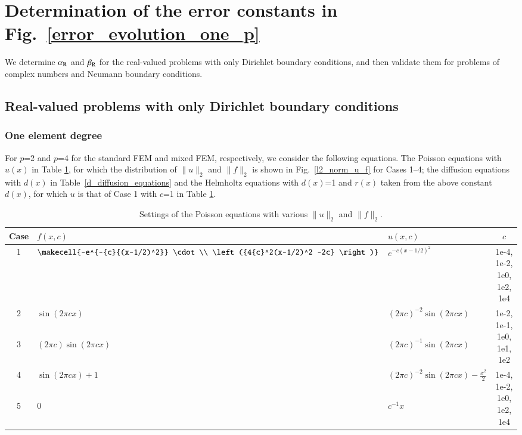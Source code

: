 \documentclass[review,3p]{elsarticle}
\begin{document}
\section{Determination of the error constants in Fig.~\ref{error_evolution_one_p}}  	\label{section_error_constants}

We determine $\alpha_{\rm R}$ and $\beta_{\rm R}$ for the real-valued problems with only Dirichlet boundary conditions, and then validate them for problems of complex numbers and Neumann boundary conditions.

\subsection{Real-valued problems with only Dirichlet boundary conditions}
\subsubsection{One element degree}

For $p$=2 and $p$=4 for the standard FEM and mixed FEM, respectively, we consider the following equations.
The Poisson equations with $u(x)$ in Table \ref{scaling_cases_Poisson}, for which the distribution of $\|u\|_2$ and $\|f\|_2$ is shown in Fig.~\ref{l2_norm_u_f} for Cases 1--4; the diffusion equations with $d(x)$ in Table~\ref{d_diffusion_equations} and the Helmholtz equations with $d(x)$=1 and $r(x)$ taken from the above constant $d(x)$, for which $u$ is that of Case 1 with $c$=1 in Table \ref{scaling_cases_Poisson}.

\begin{table}[!ht]
\centering
\caption [w]{Settings of the Poisson equations with various $\|u\|_2$ and $\|f\|_2$.} 
\label{scaling_cases_Poisson}
 \begin{tabular}{c l l c} \hline      
Case & $f(x,c)$ & $u(x,c)$ & $c$ \\ \hline
1 & $\makecell{-e^{-{c}{(x-1/2)^2}} \cdot \\ \left({4{c}^2(x-1/2)^2 -2c} \right)}$ & $e^{-{c}{{(x-1/2)^2}}}$ & {1e-4, 1e-2, 1e0, 1e2, 1e4} \\ \hline
2 & $\sin (2 \pi cx)$ & ${(2 \pi c)}^{-2} \sin (2 \pi cx)$ & \multirow{2}{*}{1e-2, 1e-1, 1e0, 1e1, 1e2} \\ \cline{1-3}
3 & $(2 \pi c) \sin (2 \pi c x)$ & ${(2 \pi c)}^{-1} \sin (2 \pi cx)$ &  \\ \hline
4 & $\sin (2 \pi c x) +1$ & ${(2 \pi c)}^{-2}\sin (2 \pi c x)-\frac{x^2}{2}$ & \multirow{2}{*}{1e-4, 1e-2, 1e0, 1e2, 1e4} \\ \cline{1-3}
5 & $0$ & ${c}^{-1} x$ &  \\ \hline
\end{tabular}
\end{table}
\end{document}

